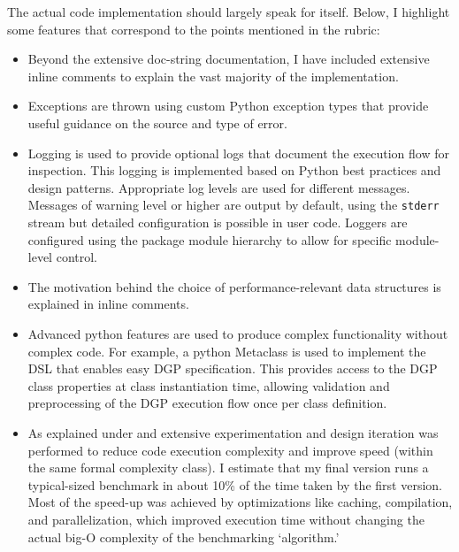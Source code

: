 \documentclass[../main.tex]{subfiles}
\begin{document}
The actual code implementation should largely speak for itself. Below, I highlight some features that correspond to the points mentioned in the rubric:

\begin{itemize}
    \item Beyond the extensive doc-string documentation, I have included extensive inline comments to explain the vast majority of the implementation.
    
    \item Exceptions are thrown using custom Python exception types that provide useful guidance on the source and type of error.
    
    \item Logging is used to provide optional logs that document the execution flow for inspection.  This logging is implemented based on Python best practices and design patterns. Appropriate log levels are used for different messages. Messages of warning level or higher are output by default, using the \texttt{stderr} stream but detailed configuration is possible in user code. Loggers are configured using the package module hierarchy to allow for specific module-level control.
    
    \item The motivation behind the choice of performance-relevant data structures is explained in inline comments.
    
    \item Advanced python features are used to produce complex functionality without complex code. For example, a python Metaclass is used to implement the DSL that enables easy DGP specification. This provides access to the DGP class properties at class instantiation time, allowing validation and preprocessing of the DGP execution flow once per class definition.
    
    \item As explained under  and  extensive experimentation and design iteration was performed to reduce code execution complexity and improve speed (within the same formal complexity class). I estimate that my final version runs a typical-sized benchmark in about 10\% of the time taken by the first version. Most of the speed-up was achieved by optimizations like caching, compilation, and parallelization, which improved execution time without changing the actual big-O complexity of the benchmarking `algorithm.'
\end{itemize}
\end{document}
